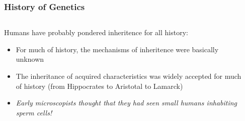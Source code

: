 \documentclass{beamer}
\begin{document}
\begin{frame}
	\frametitle{History of Genetics}
	
\begin{columns}[T]
	\begin{column}{.7\textwidth}
			Humans have probably pondered inheritence for all history:
			\vspace{10pt}
			\begin{itemize}
				\item For much of history, the mechanisms of inheritence were basically unknown
				\item The inheritance of acquired characteristics was widely accepted for much of history (from Hippocrates to Aristotal to Lamarck) \pause
				\item \emph{Early microscopists thought that they had seen small humans inhabiting sperm cells!}
			\end{itemize}
	\end{column}
	\begin{column}{.3\textwidth}
\centering

\end{column}
\end{columns}
\end{frame}
\end{document}
